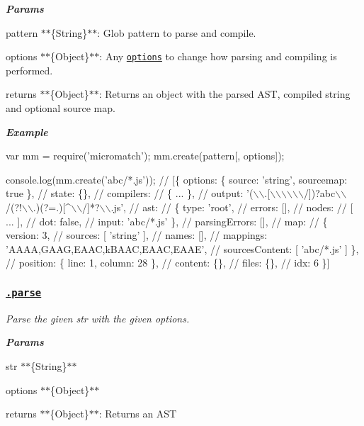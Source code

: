 {\itshape {\bfseries Params}}

{\itshape 
\begin{DoxyItemize}
\item {\ttfamily pattern} $\ast$$\ast$\{String\}$\ast$$\ast$\+: Glob pattern to parse and compile.
\item {\ttfamily options} $\ast$$\ast$\{Object\}$\ast$$\ast$\+: Any \href{#options}{\tt options} to change how parsing and compiling is performed.
\item {\ttfamily returns} $\ast$$\ast$\{Object\}$\ast$$\ast$\+: Returns an object with the parsed A\+ST, compiled string and optional source map.
\end{DoxyItemize}}

{\itshape {\bfseries Example}}

{\itshape 
\begin{DoxyCode}
var mm = require('micromatch');
mm.create(pattern[, options]);

console.log(mm.create('abc/*.js'));
// [\{ options: \{ source: 'string', sourcemap: true \},
//   state: \{\},
//   compilers:
//    \{ ... \},
//   output: '(\(\backslash\)\(\backslash\).[\(\backslash\)\(\backslash\)\(\backslash\)\(\backslash\)\(\backslash\)\(\backslash\)/])?abc\(\backslash\)\(\backslash\)/(?!\(\backslash\)\(\backslash\).)(?=.)[^\(\backslash\)\(\backslash\)/]*?\(\backslash\)\(\backslash\).js',
//   ast:
//    \{ type: 'root',
//      errors: [],
//      nodes:
//       [ ... ],
//      dot: false,
//      input: 'abc/*.js' \},
//   parsingErrors: [],
//   map:
//    \{ version: 3,
//      sources: [ 'string' ],
//      names: [],
//      mappings: 'AAAA,GAAG,EAAC,kBAAC,EAAC,EAAE',
//      sourcesContent: [ 'abc/*.js' ] \},
//   position: \{ line: 1, column: 28 \},
//   content: \{\},
//   files: \{\},
//   idx: 6 \}]
\end{DoxyCode}
}

{\itshape \subsubsection*{\href{index.js#L732}{\tt .parse}}}

{\itshape }

{\itshape Parse the given {\ttfamily str} with the given {\ttfamily options}.}

{\itshape {\bfseries Params}}

{\itshape 
\begin{DoxyItemize}
\item {\ttfamily str} $\ast$$\ast$\{String\}$\ast$$\ast$
\item {\ttfamily options} $\ast$$\ast$\{Object\}$\ast$$\ast$
\item {\ttfamily returns} $\ast$$\ast$\{Object\}$\ast$$\ast$\+: Returns an A\+ST
\end{DoxyItemize}}

